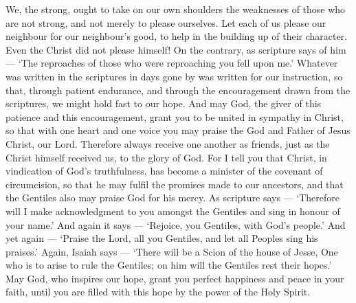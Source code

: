  We, the strong, ought to take on our own shoulders the
weaknesses of those who are not strong, and not merely to please
ourselves.  Let each of us please our neighbour for our
neighbour's good, to help in the building up of their character.
 Even the Christ did not please himself! On the contrary, as
scripture says of him --- `The reproaches of those who were reproaching
you fell upon me.'  Whatever was written in the scriptures
in days gone by was written for our instruction, so that, through
patient endurance, and through the encouragement drawn from the
scriptures, we might hold fast to our hope.  And may God,
the giver of this patience and this encouragement, grant you to be
united in sympathy in Christ,  so that with one heart and
one voice you may praise the God and Father of Jesus Christ, our Lord.
 Therefore always receive one another as friends, just as
the Christ himself received us, to the glory of God.  For I
tell you that Christ, in vindication of God's truthfulness, has become a
minister of the covenant of circumcision, so that he may fulfil the
promises made to our ancestors,  and that the Gentiles also
may praise God for his mercy. As scripture says --- `Therefore will I
make acknowledgment to you amongst the Gentiles and sing in honour of
your name.'  And again it says --- `Rejoice, you Gentiles,
with God's people.'  And yet again --- `Praise the Lord,
all you Gentiles, and let all Peoples sing his praises.' 
Again, Isaiah says --- `There will be a Scion of the house of Jesse, One
who is to arise to rule the Gentiles; on him will the Gentiles rest
their hopes.'  May God, who inspires our hope, grant you
perfect happiness and peace in your faith, until you are filled with
this hope by the power of the Holy Spirit.

